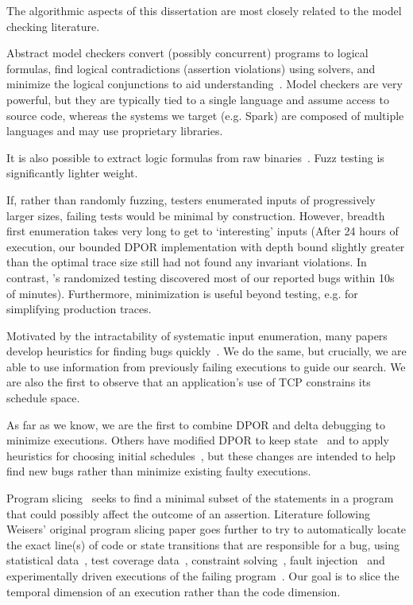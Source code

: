  The algorithmic aspects of this
dissertation are most closely
related to the model checking literature.

Abstract model checkers convert (possibly concurrent) programs to logical formulas, find
logical contradictions (assertion violations) using solvers, and minimize the logical
conjunctions to aid
understanding~\cite{christ2013flow,khoshnood2015concbugassist,machado2015concurrency}.
Model checkers are very powerful, but they are typically tied to a single
language and assume access to source code, whereas the systems we target (e.g.
Spark) are composed of multiple languages and may use proprietary
libraries.

It is also possible to extract logic formulas from raw binaries~\cite{avgerinos2014enhancing}.
Fuzz testing is significantly lighter weight.

If, rather than randomly fuzzing, testers
enumerated inputs of progressively larger sizes, failing tests would
be minimal by construction. However, breadth first enumeration takes very long to get to
`interesting' inputs (After 24 hours of execution, our bounded DPOR
implementation with depth bound slightly greater than the optimal trace size still had not found any invariant violations. In
contrast, \sys's randomized testing discovered
most of our reported bugs within 10s of minutes).
Furthermore, minimization is
useful beyond testing, e.g. for simplifying production traces.

Motivated by the intractability of systematic input enumeration, many papers
develop heuristics for finding bugs
quickly~\cite{tzoref2007instrumenting,musuvathi2007iterative,musuvathi2008finding,yabandeh2009crystalball,burckhardt2010randomized,terragnirecontest,fonseca2014ski,leesatapornwongsa2014samc,lin2009modist,park2009ctrigger,coons2010gambit}.
We do the same, but crucially, we are able to use
information from previously failing executions to guide our search.
We are also the first to observe that
an application's use
of TCP constrains its schedule space.

As far as we know, we are the first to combine DPOR and delta debugging to
minimize executions. Others have modified DPOR to keep state~\cite{yang2008efficient,yi2006stateful}
and to apply heuristics for choosing initial schedules~\cite{lauterburg2010evaluating}, but these
changes are intended to help find new bugs rather than minimize existing
faulty executions.

 Program slicing~\cite{weiser1981program}
seeks to find a minimal subset of the statements in a program that could
possibly affect the outcome of an assertion.
Literature following Weisers' original program
slicing paper goes further to try to
automatically locate the exact line(s) of code or state transitions that are responsible for a
bug, using statistical data~\cite{zhangzhang}, test coverage
data~\cite{coverage_localization,xuan14}, constraint solving~\cite{jose11},
fault injection~\cite{zhang13} and
experimentally driven executions of the failing program~\cite{zeller2005,comparative_causality}.
Our goal is to slice the temporal dimension of an execution rather than the
code dimension.

